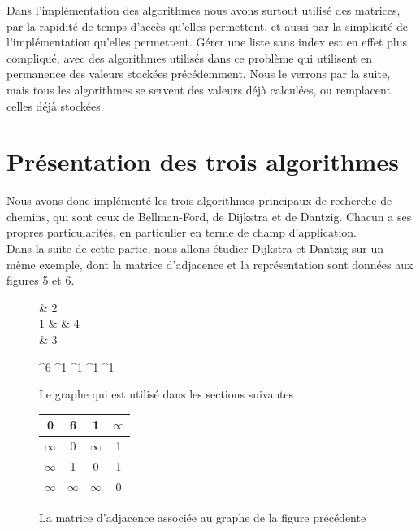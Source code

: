 \documentclass[a4paper,12pt,final] {article}
\begin{document}
Dans l'implémentation des algorithmes nous avons surtout utilisé des matrices, par la rapidité de temps d'accès qu'elles permettent, et aussi par la simplicité de l'implémentation qu'elles permettent. Gérer une liste sans index est en effet plus compliqué, avec des algorithmes utilisés dans ce problème qui utilisent en permanence des valeurs stockées précédemment. Nous le verrons par la suite, mais tous les algorithmes se servent des valeurs déjà calculées, ou remplacent celles déjà stockées.\\

\newpage
\section{Présentation des trois algorithmes}

Nous avons donc implémenté les trois algorithmes principaux de recherche de chemins, qui sont ceux de Bellman-Ford, de Dijkstra et de Dantzig. Chacun a ses propres particularités, en particulier en terme de champ d'application.\\

Dans la suite de cette partie, nous allons étudier Dijkstra et Dantzig sur un même exemple, dont la matrice d'adjacence et la représentation sont données aux figures 5 et 6.\\ %

\begin{figure}[H]
 \centering
 \begin{psmatrix}[mnode=circle]
	    & 2\\
	 1 &    & 4\\
	    & 3\\
\end{psmatrix}
	
	^{6}
	^{1}
	^{1}
	^{1}
	^{1}

  \caption{Le graphe qui est utilisé dans les sections suivantes}
\end{figure}

\begin{figure}[H]
\begin{center}
\begin{tabular}{|c|c|c|c|}
\hline
0 & 6 & 1 & $\infty$\\
\hline
$\infty$ & 0 & $\infty$ & 1\\
\hline
$\infty$ & 1 & 0 & 1\\
\hline
$\infty$ & $\infty$ & $\infty$ & 0\\
\hline
\end{tabular}
\end{center}
\caption{La matrice d'adjacence associée au graphe de la figure précédente}
\end{figure}
\end{document}
